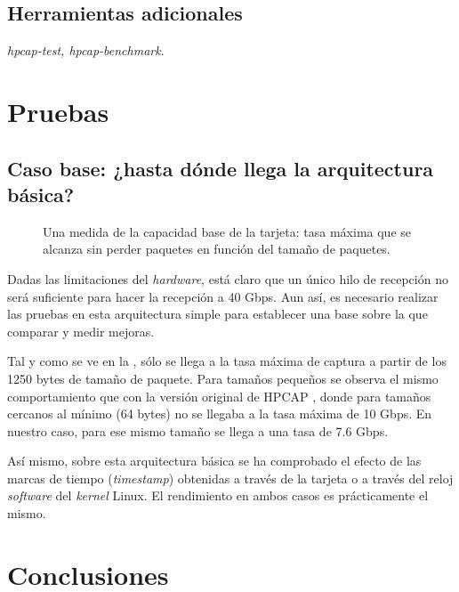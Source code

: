 \documentclass[twoside, draft]{epstfg}
\begin{document}
\section{Herramientas adicionales}

\textit{hpcap-test, hpcap-benchmark}.

\chapter{Pruebas}

\section{Caso base: ¿hasta dónde llega la arquitectura básica?}

\begin{figure}[btp]
\caption{Una medida de la capacidad base de la tarjeta: tasa máxima que se alcanza sin perder paquetes en función del tamaño de paquetes.}
\label{fig:SimpleArch:MaxRate}
\end{figure}

Dadas las limitaciones del \textit{hardware}, está claro que un único hilo de recepción no será suficiente para hacer la recepción a 40 Gbps. Aun así, es necesario realizar las pruebas en esta arquitectura simple para establecer una base sobre la que comparar y medir mejoras.

Tal y como se ve en la , sólo se llega a la tasa máxima de captura a partir de los 1250 bytes de tamaño de paquete. Para tamaños pequeños se observa el mismo comportamiento que con la versión original de HPCAP \citep{MorenoTFM2012}, donde para tamaños cercanos al mínimo (64 bytes) no se llegaba a la tasa máxima de 10 Gbps. En nuestro caso, para ese mismo tamaño se llega a una tasa de 7.6 Gbps.

Así mismo, sobre esta arquitectura básica se ha comprobado el efecto de las marcas de tiempo (\textit{timestamp}) obtenidas a través de la tarjeta o a través del reloj \textit{software} del \textit{kernel} Linux. El rendimiento en ambos casos es prácticamente el mismo.


\chapter{Conclusiones}

\appendix

\printnoidxglossaries
\cleardoublepage

\nocite{*}
{}

\cleardoublepage
\printindex
\end{document}
